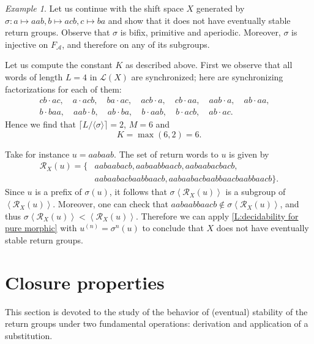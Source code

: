 \documentclass{amsart}
\newcommand*{\ret}{\mathcal{R}}
\newcommand*{\lang}{\mathcal{L}}
\newcommand*{\cA}{\mathcal{A}}
\newcommand*{\from}{\colon}
\newcommand*{\gen}[1]{\left\langle #1\right\rangle}
\theoremstyle{plain}
\theoremstyle{definition}
\theoremstyle{remark}
\newtheorem{example}[theorem]{Example}
\begin{document}
\begin{example}\label{eg:non-stable}
    Let us continue with the shift space $X$ generated by $\sigma\from a\mapsto aab, b\mapsto acb, c\mapsto ba$ and show that it does not have eventually stable return groups. Observe that $\sigma$ is bifix, primitive and aperiodic. Moreover, $\sigma$ is injective on $F_\cA$, and therefore on any of its subgroups.
    
    Let us compute the constant $K$ as described above. First we observe that all words of length $L=4$ in $\lang(X)$ are synchronized; here are synchronizing factorizations for each of them:
    \begin{gather*}
        cb\cdot ac,\quad
        a\cdot acb,\quad
        ba\cdot ac,\quad
        acb\cdot a,\quad
        cb\cdot aa,\quad 
        aab\cdot a,\quad 
        ab\cdot aa,\quad \\
        b\cdot baa,\quad 
        aab\cdot b,\quad 
        ab\cdot ba,\quad 
        b\cdot aab,\quad 
        b\cdot acb,\quad 
        ab\cdot ac.
    \end{gather*} 
    Hence we find that $\lceil L/\langle\sigma\rangle\rceil=2$, $M=6$ and
    \begin{equation*}
        K = \max(6,2) = 6.
    \end{equation*}
    
    Take for instance $u = aabaab$. The set of return words to $u$ is given by
    \begin{align*}
            \ret_X(u) = \{ & aabaabacb, aabaabbaacb, aabaabacbacb, \\
                           & aabaabacbaabbaacb, aabaabacbaabbaacbaabbaacb\}.
    \end{align*}
    Since $u$ is a prefix of $\sigma(u)$, it follows that $\sigma\gen{\ret_X(u)}$ is a subgroup of $\gen{\ret_X(u)}$. Moreover, one can check that $aabaabbaacb\notin \sigma\gen{\ret_X(u)}$, and thus $\sigma\gen{\ret_X(u)} < \gen{\ret_X(u)}$. Therefore we can apply \cref{L:decidability for pure morphic} with $u^{(n)} = \sigma^n(u)$ to conclude that $X$ does not have eventually stable return groups.
\end{example}

\section{Closure properties}\label{S:closure properties}

This section is devoted to the study of the behavior of (eventual) stability of the return groups under two fundamental operations: derivation and application of a substitution.
\end{document}
